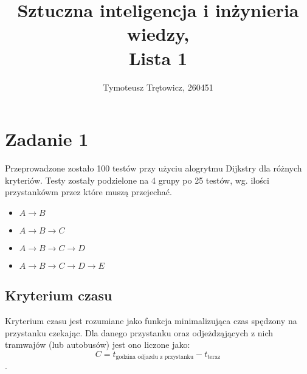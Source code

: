 \documentclass[12pt,a4paper]{article}
\title{Sztuczna inteligencja i inżynieria wiedzy, \\ Lista 1}
\author{Tymoteusz Trętowicz, 260451}
\date{}
\begin{document}
    \maketitle
    \pagebreak
    \section*{Zadanie 1}
    Przeprowadzone zostało 100 testów przy użyciu alogrytmu Dijkstry dla różnych kryteriów. Testy zostały podzielone na 4 grupy po 25 testów, wg. ilości przystankówm przez które muszą przejechać.
    \begin{itemize}
        \item $A \rightarrow B$
        \item $A \rightarrow B \rightarrow C$
        \item $A \rightarrow B \rightarrow C \rightarrow D$
        \item $A \rightarrow B \rightarrow C \rightarrow D \rightarrow E$
    \end{itemize}
    \subsection*{Kryterium czasu}
    Kryterium czasu jest rozumiane jako funkcja minimalizująca czas spędzony na przystanku czekając. Dla danego przystanku oraz odjeżdząjących z nich tramwajów (lub autobusów) jest ono liczone jako:$$C = t_{\text{godzina odjazdu z przystanku}} - t_{\text{teraz}}$$.
\end{document}
